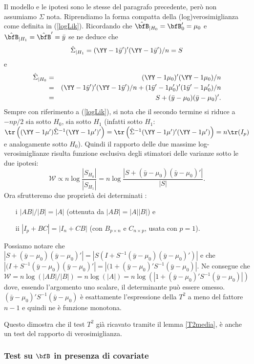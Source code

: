 \documentclass[]{article}
\begin{document}
Il modello e le ipotesi sono le stesse del paragrafo precedente, però
non assumiamo \(\Sigma\) nota. Riprendiamo la forma compatta della
(log)verosimiglianza come definita in (\ref{logLik}). Ricordando che
\(\hat{\bfB}_{|H_0}=\bfB_0'=\mu_0\) e
\(\hat{\bfB}_{|H_1}=\hat{\bfB}'=\bar{y}\) se ne deduce che
\[\hat{\Sigma}_{|H_1}=(\YY-1\bar{y}')'(\YY-1\bar{y}')/n=S\] e
\begin{eqnarray*}
\hat{\Sigma}_{|H_0}&=&(\YY-1\mu_0)'(\YY-1\mu_0)/n\\
&=&(\YY-1\bar{y}')'(\YY-1\bar{y}')/n +(1\bar{y}'-1\mu_0')'(1\bar{y}'-1\mu_0')/n\\
&=&S+(\bar{y}-\mu_0)(\bar{y}-\mu_0)'.
 \end{eqnarray*} Sempre con riferimento a (\ref{logLik}), si nota che il
secondo termine si riduce a \(-np/2\) sia sotto \(H_0\), sia sotto
\(H_1\) (infatti sotto \(H_1\):
\(\tr\left( (\YY-1\mu')\hat{\Sigma}^{-1}(\YY-1\mu')' \right)= \tr\left( \hat{\Sigma}^{-1}(\YY-1\mu')'(\YY-1\mu') \right)=n\tr(I_p)\)
e analogamente sotto \(H_0\)). Quindi il rapporto delle due massime
log-verosimiglianze risulta funzione esclusiva degli stimatori delle
varianze sotto le due ipotesi:
\[\mathcal{W}\propto n\log\frac{|S_{H_0}|}{|S_{H_1}|}=n\log\frac{|S+(\bar{y}-\mu_0)(\bar{y}-\mu_0)'|}{|S|}.\]
Ora sfrutteremo due proprietà dei determinati :

\begin{itemize}
\item[i ] $|AB|/|B|=|A|$ (ottenuta da $|AB|=|A||B|$) e 
\item[ii ] $|I_p+BC|=|I_n+CB|$ (con $B_{p\times n}$ e $C_{n\times p}$, usata con $p=1$).
\end{itemize}

Possiamo notare che
\(|S+(\bar{y}-\mu_0)(\bar{y}-\mu_0)'| =|S(I+S^{-1}(\bar{y}-\mu_0)(\bar{y}-\mu_0)')|\)
e che
\(|(I+S^{-1}(\bar{y}-\mu_0)(\bar{y}-\mu_0)'|=|(1+(\bar{y}-\mu_0)'S^{-1}(\bar{y}-\mu_0)|\).
Ne consegue che
\(\mathcal{W}=n\log(|AB|/|B|)=n\log(|A|)=n\log(|1 + (\bar{y}-\mu_0)'S^{-1}(\bar{y}-\mu_0)|)\)
dove, essendo l'argomento uno scalare, il determinante può essere
omesso. \((\bar{y}-\mu_0)'S^{-1}(\bar{y}-\mu_0)\) è esattamente
l'espressione della \(T^2\) a meno del fattore \(n-1\) e quindi ne è
funzione monotona.

Questo dimostra che il test \(T^2\) già ricavato tramite il lemma
\ref{T2media}, è anche un test del rapporto di verosimiglianza.

\subsubsection{Test su $\bfB$ in presenza di covariate}
\end{document}
